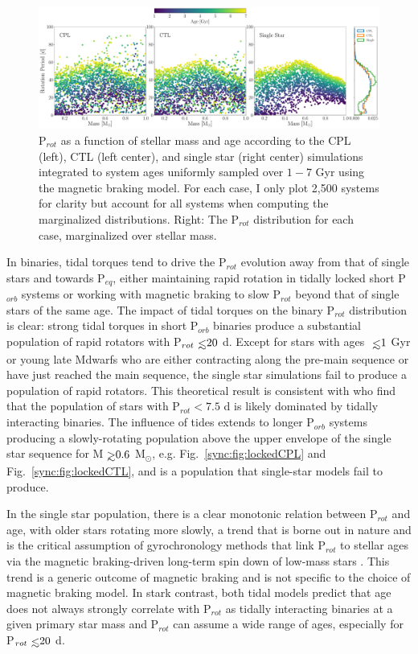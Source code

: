 \begin{figure}
	\includegraphics[width=\columnwidth]{protDist.pdf}
   \caption{P$_{rot}$ as a function of stellar mass and age according to the CPL (left), CTL (left center), and single star (right center) simulations integrated to system ages uniformly sampled over $1-7$ Gyr using the \citet{Matt2015} magnetic braking model. For each case, I only plot 2,500 systems for clarity but account for all systems when computing the marginalized distributions. Right: The P$_{rot}$ distribution for each case, marginalized over stellar mass.}%
    \label{sync:fig:protDist}%
\end{figure}

In binaries, tidal torques tend to drive the P$_{rot}$ evolution away from that of single stars and towards P$_{eq}$, either maintaining rapid rotation in tidally locked short P$_{orb}$ systems or working with magnetic braking to slow P$_{rot}$ beyond that of single stars of the same age. The impact of tidal torques on the binary P$_{rot}$ distribution is clear: strong tidal torques in short P$_{orb}$ binaries produce a substantial population of rapid rotators with P$_{rot} \lsim 20$ d. Except for stars with ages $\lsim 1$ Gyr or young late Mdwarfs who are either contracting along the pre-main sequence or have just reached the main sequence, the single star simulations fail to produce a population of rapid rotators. This theoretical result is consistent with \citet{Simonian2018} who find that the population of \kepler stars with P$_{rot} < 7.5$ d is likely dominated by tidally interacting binaries.  The influence of tides extends to longer P$_{orb}$ systems producing a slowly-rotating population above the upper envelope of the single star sequence for M$ \gsim 0.6$ M$_{\odot}$, e.g. Fig.~\ref{sync:fig:lockedCPL} and Fig.~\ref{sync:fig:lockedCTL}, and is a population that single-star models fail to produce. 

In the single star population, there is a clear monotonic relation between P$_{rot}$ and age, with older stars rotating more slowly, a trend that is borne out in nature and is the critical assumption of gyrochronology methods that link P$_{rot}$ to stellar ages via the magnetic braking-driven long-term spin down of low-mass stars \citep[e.g.][]{Skumanich1972,Barnes2003,Barnes2007,Mamajek2008,Barnes2010,Meibom2015}. This trend is a generic outcome of magnetic braking and is not specific to the choice of magnetic braking model. In stark contrast, both tidal models predict that age does not always strongly correlate with P$_{rot}$ as tidally interacting binaries at a given primary star mass and P$_{rot}$ can assume a wide range of ages, especially for P$_{rot} \lsim 20$ d. 

